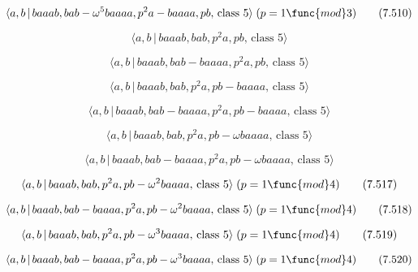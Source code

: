 \documentclass[10pt]{article}
\begin{document}
\begin{equation}
\langle a,b\,|\,baaab,bab-\omega ^{5}baaaa,p^{2}a-baaaa,pb,\,\text{class }%
5\rangle \;(p=1\func{mod}3)  \tag{7.510}
\end{equation}

\begin{equation}
\langle a,b\,|\,baaab,bab,p^2a,pb,\,\text{class }5\rangle  \tag{7.511}
\end{equation}

\begin{equation}
\langle a,b\,|\,baaab,bab-baaaa,p^2a,pb,\,\text{class }5\rangle  \tag{7.512}
\end{equation}

\begin{equation}
\langle a,b\,|\,baaab,bab,p^2a,pb-baaaa,\,\text{class }5\rangle  \tag{7.513}
\end{equation}

\begin{equation}
\langle a,b\,|\,baaab,bab-baaaa,p^2a,pb-baaaa,\,\text{class }5\rangle 
\tag{7.514}
\end{equation}

\begin{equation}
\langle a,b\,|\,baaab,bab,p^{2}a,pb-\omega baaaa,\,\text{class }5\rangle 
\tag{7.515}
\end{equation}

\begin{equation}
\langle a,b\,|\,baaab,bab-baaaa,p^{2}a,pb-\omega baaaa,\,\text{class }%
5\rangle  \tag{7.516}
\end{equation}

\begin{equation}
\langle a,b\,|\,baaab,bab,p^{2}a,pb-\omega ^{2}baaaa,\,\text{class }5\rangle
\;(p=1\func{mod}4)  \tag{7.517}
\end{equation}

\begin{equation}
\langle a,b\,|\,baaab,bab-baaaa,p^{2}a,pb-\omega ^{2}baaaa,\,\text{class }%
5\rangle \;(p=1\func{mod}4)  \tag{7.518}
\end{equation}

\begin{equation}
\langle a,b\,|\,baaab,bab,p^{2}a,pb-\omega ^{3}baaaa,\,\text{class }5\rangle
\;(p=1\func{mod}4)  \tag{7.519}
\end{equation}

\begin{equation}
\langle a,b\,|\,baaab,bab-baaaa,p^{2}a,pb-\omega ^{3}baaaa,\,\text{class }%
5\rangle \;(p=1\func{mod}4)  \tag{7.520}
\end{equation}
\end{document}
